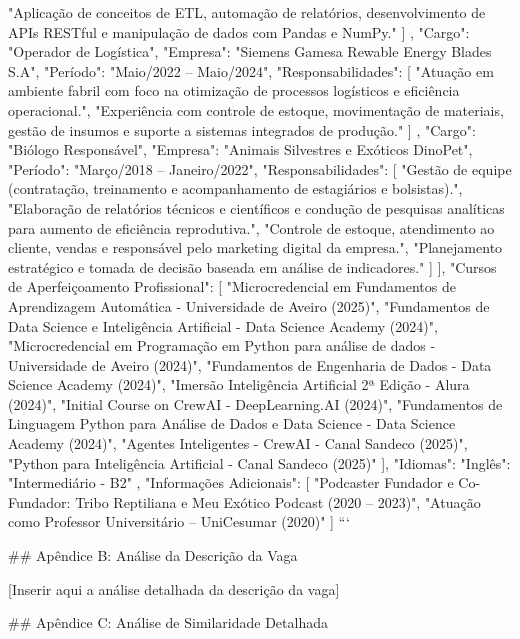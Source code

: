 {{{          "Aplicação de conceitos de ETL, automação de relatórios, desenvolvimento de APIs RESTful e manipulação de dados com Pandas e NumPy."
        ]
      },
      {
        "Cargo": "Operador de Logística",
        "Empresa": "Siemens Gamesa Rewable Energy Blades S.A",
        "Período": "Maio/2022 – Maio/2024",
        "Responsabilidades": [
          "Atuação em ambiente fabril com foco na otimização de processos logísticos e eficiência operacional.",
          "Experiência com controle de estoque, movimentação de materiais, gestão de insumos e suporte a sistemas integrados de produção."
        ]
      },
      {
        "Cargo": "Biólogo Responsável",
        "Empresa": "Animais Silvestres e Exóticos DinoPet",
        "Período": "Março/2018 – Janeiro/2022",
        "Responsabilidades": [
          "Gestão de equipe (contratação, treinamento e acompanhamento de estagiários e bolsistas).",
          "Elaboração de relatórios técnicos e científicos e condução de pesquisas analíticas para aumento de eficiência reprodutiva.",
          "Controle de estoque, atendimento ao cliente, vendas e responsável pelo marketing digital da empresa.",
          "Planejamento estratégico e tomada de decisão baseada em análise de indicadores."
        ]
      }
    ],
    "Cursos de Aperfeiçoamento Profissional": [
      "Microcredencial em Fundamentos de Aprendizagem Automática - Universidade de Aveiro (2025)",
      "Fundamentos de Data Science e Inteligência Artificial - Data Science Academy (2024)",
      "Microcredencial em Programação em Python para análise de dados - Universidade de Aveiro (2024)",
      "Fundamentos de Engenharia de Dados - Data Science Academy (2024)",
      "Imersão Inteligência Artificial 2ª Edição - Alura (2024)",
      "Initial Course on CrewAI - DeepLearning.AI (2024)",
      "Fundamentos de Linguagem Python para Análise de Dados e Data Science - Data Science Academy (2024)",
      "Agentes Inteligentes - CrewAI - Canal Sandeco (2025)",
      "Python para Inteligência Artificial - Canal Sandeco (2025)"
    ],
    "Idiomas": {
      "Inglês": "Intermediário - B2"
    },
    "Informações Adicionais": [
      "Podcaster Fundador e Co-Fundador: Tribo Reptiliana e Meu Exótico Podcast (2020 – 2023)",
      "Atuação como Professor Universitário – UniCesumar (2020)"
    ]
  }
}
```

## Apêndice B: Análise da Descrição da Vaga

[Inserir aqui a análise detalhada da descrição da vaga]

## Apêndice C: Análise de Similaridade Detalhada

